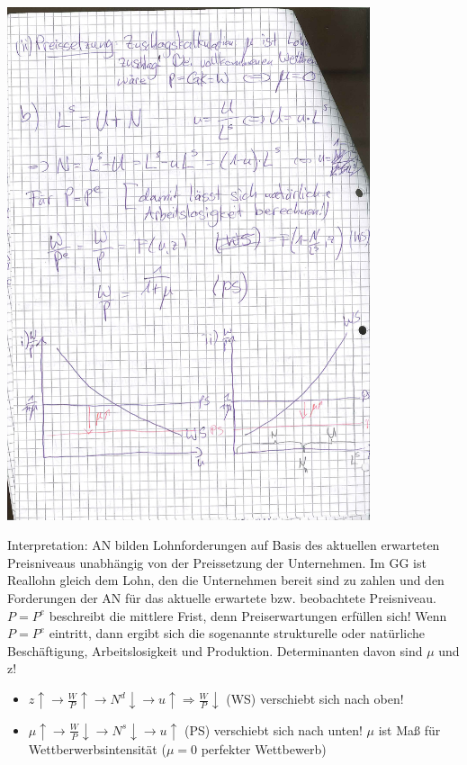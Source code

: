 \documentclass{scrartcl}
\begin{document}
\begin{enumerate}[a)]
\begin{center}
  \includegraphics[width=0.8\textwidth]{Bilder/WSPSDiagramm.pdf}
\end{center}
  Interpretation: AN bilden Lohnforderungen auf Basis des aktuellen erwarteten Preisniveaus unabh\"{a}ngig von der Preissetzung der Unternehmen. Im GG ist Reallohn gleich dem Lohn, den die Unternehmen bereit sind zu zahlen und den Forderungen der AN f\"{u}r das aktuelle erwartete bzw. beobachtete Preisniveau. $P=P^e$ beschreibt die mittlere Frist, denn Preiserwartungen erf\"{u}llen sich! Wenn $P=P^e$ eintritt, dann ergibt sich die sogenannte strukturelle oder nat\"{u}rliche Besch\"{a}ftigung, Arbeitslosigkeit und Produktion. Determinanten davon sind $\mu$ und z!
  \begin{itemize}
    \item $z\uparrow \rightarrow \frac{W}{P}\uparrow \rightarrow N^{d} \downarrow \rightarrow u \uparrow \Rightarrow \frac{W}{P} \downarrow$ (WS) verschiebt sich nach oben!
    \item $\mu \uparrow \rightarrow \frac{W}{P} \downarrow \rightarrow N^s \downarrow \rightarrow u \uparrow$ (PS) verschiebt sich nach unten! $\mu$ ist Ma{\ss} f\"{u}r Wettberwerbsintensit\"{a}t ($\mu=0$ perfekter Wettbewerb)
  \end{itemize}

\end{enumerate}
\end{document}
